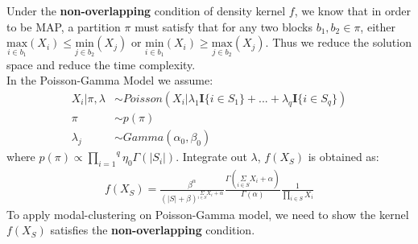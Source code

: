 \documentclass[aoas,preprint]{imsart}
\begin{document}
Under the \textbf{non-overlapping} condition of density kernel $f$, we know that in order to be MAP, a partition $\pi$ must satisfy that for any two blocks $b_1, b_2 \in \pi$, either $\underset{i \in b_1}{\text{max}}(X_i) \leq \underset{j\in b_2}{\text{min}}(X_j)$ or $\underset{i \in b_1}{\text{min}}(X_i) \geq \underset{j\in b_2}{\text{max}}(X_j)$. Thus we reduce the solution space and reduce the time complexity.\\
In the Poisson-Gamma Model we assume:\\
\begin{align*}
X_i | \pi, \lambda &\sim Poisson(X_i | \lambda_1\textbf{I}\{i\in S_1\} + ... + \lambda_q\textbf{I}\{i \in S_q\})\\
\pi &\sim p(\pi)\\
\lambda_j &\sim Gamma(\alpha_0, \beta_0)
\end{align*}
where $p(\pi)\propto \overset{q}{\underset{i = 1}{\prod}}\eta_0\Gamma(|S_i|)$. Integrate out $\lambda$, $f(X_{S})$ is obtained as:
\begin{eqnarray*}
f(X_{S}) = \frac{\beta^\alpha}{(|S| + \beta)^{\underset{i \in S}{\Sigma} X_i + \alpha}} \frac{\Gamma(\underset{i \in S}{\Sigma} X_i  + \alpha)}{\Gamma(\alpha)} \frac{1}{\underset{i \in S}{\prod }X_i}
\end{eqnarray*}
To apply modal-clustering on Poisson-Gamma model, we need to show the kernel $f(X_S)$ satisfies the \textbf{non-overlapping} condition.
\end{document}

